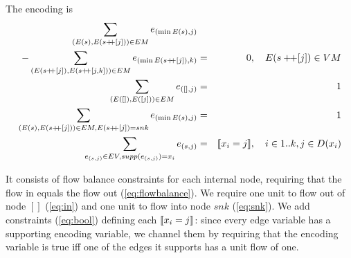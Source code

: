 \documentclass[a4paper,UKenglish,cleveref,autoref,thm-restate]{lipics-v2021}
\begin{document}
The encoding is
\begin{eqnarray}
\sum_{(E(s),E(s \pp [j])) \in EM} e_{(\min E(s),j)} \nonumber \\ 
- \sum_{(E(s \pp [j]),E(s \pp [j,k])) \in EM} e_{(\min E(s \pp [j]), k)} & = & 0, \quad E(s \pp [j]) \in VM \label{eq:flowbalance} \\
\sum_{(E([]),E([j])) \in EM} e_{([],j)} & = & 1 \label{eq:in} \\
\sum_{(E(s),E(s \pp [j])) \in EM, E(s \pp [j]) = snk} e_{(\min E(s),j)} & = &1 \label{eq:snk}\\
\sum_{e_{(s,j)} \in EV, supp(e_{(s,j)}) = x_i} e_{(s,j)} & =& \beq{x_i}{j}, \quad i \in 1..k, j \in D(x_i)
\label{eq:bool}
\end{eqnarray}

It consists of flow balance constraints for each internal node, requiring that the flow in equals the flow out (\cref{eq:flowbalance}). 
We require one unit to flow out of node $[]$ 
(\cref{eq:in}) and one
unit to flow into node $snk$ (\cref{eq:snk}). 
We add constraints (\cref{eq:bool}) defining each
$[\![x_i = j]\!]$: since every edge variable has a supporting encoding variable, we channel them by requiring that the encoding variable is true iff one of the edges it supports has a unit flow of one.
\end{document}
